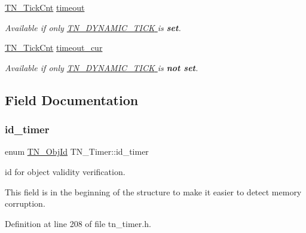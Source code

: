 \begin{DoxyCompactItemize}
\hyperlink{tn__common_8h_ac885b63d00c063de61cdbd80bf26d8aa}{T\+N\+\_\+\+Tick\+Cnt} \hyperlink{structTN__Timer_a893c5b01ec38bdcbcf2294cc950ffd09}{timeout}
\begin{DoxyCompactList}\small\item\em {\itshape Available if only \hyperlink{tn__cfg__default_8h_aaee875834a86f961318c584095c366fe}{{\ttfamily T\+N\+\_\+\+D\+Y\+N\+A\+M\+I\+C\+\_\+\+T\+I\+CK} } is {\bfseries set}.} \end{DoxyCompactList}\item 
\hyperlink{tn__common_8h_ac885b63d00c063de61cdbd80bf26d8aa}{T\+N\+\_\+\+Tick\+Cnt} \hyperlink{structTN__Timer_a6041c660dad74778f668bac9ae844465}{timeout\+\_\+cur}
\begin{DoxyCompactList}\small\item\em {\itshape Available if only \hyperlink{tn__cfg__default_8h_aaee875834a86f961318c584095c366fe}{{\ttfamily T\+N\+\_\+\+D\+Y\+N\+A\+M\+I\+C\+\_\+\+T\+I\+CK} } is {\bfseries not set}.} \end{DoxyCompactList}\end{DoxyCompactItemize}


\subsection{Field Documentation}
\mbox{\label{structTN__Timer_a27482d3470455064da95b9453ae87156}} 
\subsubsection{\texorpdfstring{id\+\_\+timer}{id\_timer}}
{\footnotesize\ttfamily enum \hyperlink{tn__common_8h_ae779dd1f6735f6e139fb70acd004d976}{T\+N\+\_\+\+Obj\+Id} T\+N\+\_\+\+Timer\+::id\+\_\+timer}



id for object validity verification. 

This field is in the beginning of the structure to make it easier to detect memory corruption. 

Definition at line 208 of file tn\+\_\+timer.\+h.

\mbox{\label{structTN__Timer_ab1410fa78c9099a6bc4dd3f43f1f52e4}} 
